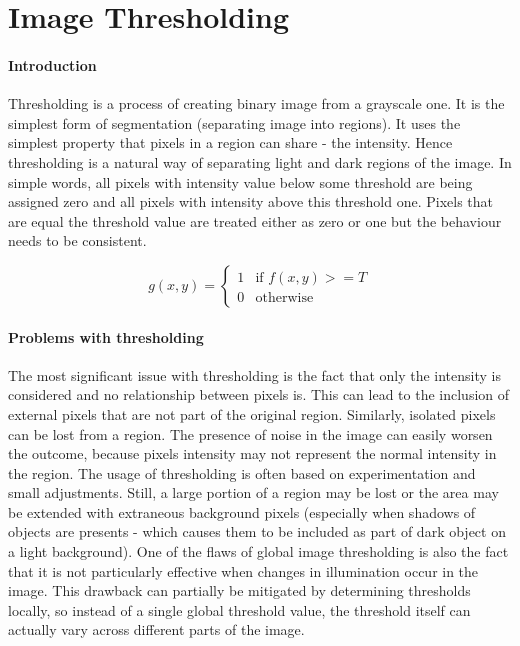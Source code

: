 \paragraph{}

\section{Image Thresholding}
\paragraph{Introduction}
Thresholding is a process of creating binary image from a grayscale one.\cite{digital-image-processing} It is the simplest form of segmentation (separating image into regions). It uses the simplest property that pixels in a region can share - the intensity. Hence thresholding is a natural way of separating light and dark regions of the image. In simple words, all pixels with intensity value below some threshold are being assigned zero and all pixels with intensity above this threshold one. Pixels that are equal the threshold value are treated either as zero or one but the behaviour needs to be consistent. 

\begin{equation}
	g(x, y) = \begin{cases}
		1 & \text{if $f(x, y) >= T$}\\
		0 & \text{otherwise}
	\end{cases}
\end{equation}

\paragraph{Problems with thresholding}
The most significant issue with thresholding is the fact that only the intensity is considered and no relationship between pixels is. This can lead to the inclusion of external pixels that are not part of the original region. Similarly, isolated pixels can be lost from a region. The presence of noise in the image can easily worsen the outcome, because pixels intensity may not represent the normal intensity in the region. The usage of thresholding is often based on experimentation and small adjustments. Still, a large portion of a region may be lost or the area may be extended with extraneous background pixels (especially when shadows of objects are presents - which causes them to be included as part of dark object on a light background). One of the flaws of global image thresholding is also the fact that it is not particularly effective when changes in illumination occur in the image. This drawback can partially be mitigated by determining thresholds locally, so instead of a single global threshold value, the threshold itself can actually vary across different parts of the image.

